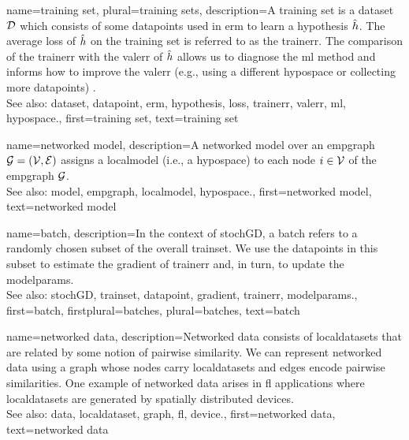 {name={training set}, plural={training sets},
	description={A training set is a \gls{dataset} $\mathcal{D}$ which consists of some \glspl{datapoint} used in \gls{erm} 
		to learn a \gls{hypothesis} $\hat{h}$. The average \gls{loss} of $\hat{h}$ on the 
		training set is referred to as the \gls{trainerr}. The comparison of the \gls{trainerr} with the 
		\gls{valerr} of $\hat{h}$ allows us to diagnose the \gls{ml} method and informs how to improve 
		the \gls{valerr} (e.g., using a different \gls{hypospace} or collecting more \glspl{datapoint}) \cite[Sec. 6.6]{MLBasics}.
			\\
		See also: \gls{dataset}, \gls{datapoint}, \gls{erm}, \gls{hypothesis}, \gls{loss}, \gls{trainerr}, \gls{valerr}, \gls{ml}, \gls{hypospace}.},
	first={training set},
	text={training set}  
}

{name={networked model},
 	description={A networked \gls{model} over an \gls{empgraph} $\mathcal{G} = \left( \mathcal{V},\mathcal{E} \right)$ assigns 
   		a \gls{localmodel} (i.e., a \gls{hypospace}) to each node $i \in \mathcal{V}$ of the \gls{empgraph} $\mathcal{G}$.
   		\\
		See also: \gls{model}, \gls{empgraph}, \gls{localmodel}, \gls{hypospace}.}, 
   first={networked model},
   text={networked model}  
}

{name={batch},
	description={In the context of \gls{stochGD}, a batch refers to a randomly 
		chosen subset of the overall \gls{trainset}. We use the \glspl{datapoint} in this subset 
		to estimate the \gls{gradient} of \gls{trainerr} and, in turn, to update the \gls{modelparams}.
			\\
		See also: \gls{stochGD}, \gls{trainset}, \gls{datapoint}, \gls{gradient}, \gls{trainerr}, \gls{modelparams}.}, 
 	first={batch},
 	firstplural={batches}, 
 	plural={batches}, 
 	text={batch}  
}

{name={networked data},
	description={Networked \gls{data} consists of \glspl{localdataset} 
		that are related by some notion of pairwise similarity. We can represent networked 
		\gls{data} using a \gls{graph} whose nodes carry \glspl{localdataset} and edges encode 
		pairwise similarities. One example of networked \gls{data} arises in \gls{fl} applications 
		where \glspl{localdataset} are generated by spatially distributed \glspl{device}.
			\\
		See also: \gls{data}, \gls{localdataset}, \gls{graph}, \gls{fl}, \gls{device}.}, 
	first={networked data},
	text={networked data}  
}


